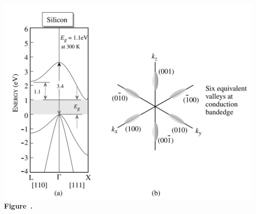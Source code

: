\begin{center}
	\begin{minipage}{0.7\textwidth}
		\centering
		\includegraphics[width=\textwidth]{img/silicon.png}
		\\[0.5em]
		\textbf{Figure~\thefigure.}
		\label{fig:Silicon}
	\end{minipage}
\end{center}

